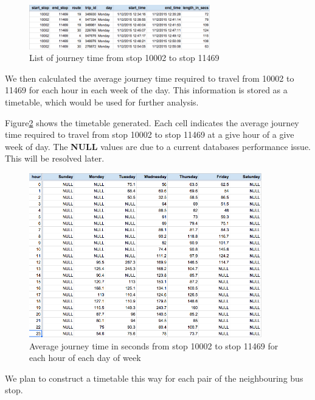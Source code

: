 \begin{figure}
\centering
\includegraphics[width=0.7\textwidth]{figures/journey_time_10002.png}
\caption{\label{fig:journey_time_10002} List of journey time from stop 10002 to stop 11469}
\end{figure}

\par We then calculated the average journey time required to travel from 10002 to 11469 for each hour in each week of the day. This information is stored as a timetable, which would be used for further analysis.

\par Figure\ref{fig:timetable_10002} shows the timetable generated. Each cell indicates the average journey time required to travel from stop 10002 to stop 11469 at a give hour of a give week of day. The \textbf{NULL} values are due to a current databases performance issue. This will be resolved later.

\begin{figure}
\centering
\includegraphics[width=0.9\textwidth]{figures/timetable_10002.png}
\caption{\label{fig:timetable_10002} Average journey time in seconds from stop 10002 to stop 11469 for each hour of each day of week}
\end{figure}

\par We plan to construct a timetable this way for each pair of the neighbouring bus stop.

